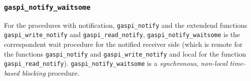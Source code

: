\documentclass[a4paper]{article}
\newlength{\st}\setlength{\st}{0pt}
\newcommand{\zsep}[1]{#1}
\newcommand{\gaspiprefix}{gaspi}
\newcommand{\function}[1]{{\tt #1}}
\newcommand{\gaspifunction}[1]{\function{\protect\zsep{\gaspiprefix\_#1}}}
\newcommand{\finalsymb}[1]{\leavevmode\unskip\penalty9999\hbox{}\nobreak\hfill\hskip 1em minus 0.5em\hbox{#1}}
\newcommand{\GASPITEST}{{\tt\protect\zsep{GASPI\_TEST}}}
\newcommand{\gaspisemantic}[1]{{\emph{#1}}}
\newenvironment{implementoradvice}{\begin{flushright}\begin{minipage}[t]{0.9\linewidth}\emph{Implementor advice:}}{\finalsymb{$\lrcorner$}\end{minipage}\end{flushright}}
\newenvironment{useradvice}{\begin{flushright}\begin{minipage}[t]{0.9\linewidth}\emph{User advice:}}{\finalsymb{$\lrcorner$}\end{minipage}\end{flushright}}
\newcommand{\insertlisting}[2]{\lstset{
basicstyle=\ttfamily
, caption={#2}
, frame=single
, numbers=left
, numberstyle=\tiny
, stepnumber=1
, showstringspaces=true
, keepspaces=true
, columns=fullflexible
, classoffset=0
, morekeywords={gaspi_rank_t,gaspi_barrier,gaspi_timeout_t,gaspi_return_t,gaspi_config_t,gaspi_proc_init,gaspi_proc_term,gaspi_proc_kill
  ,gaspi_group_commit,gaspi_group_create,gaspi_group_add,gaspi_group_size,gaspi_group_ranks
  ,gaspi_segment_id_t,gaspi_segment_alloc,gaspi_segment_register,gaspi_segment_create
  ,gaspi_segment_ptr,gaspi_queue_id_t,gaspi_offset_t,gaspi_socket_id_t,gaspi_size_t,gaspi_pointer_t
  ,gaspi_write,gaspi_read,gaspi_wait
  ,gaspi_notify,gaspi_notify_reset,gaspi_notify_wait ,gaspi_atomic_value_t
  ,gaspi_proc_num,gaspi_proc_rank
  ,gaspi_number_t,gaspi_notification_t,gaspi_notification_id_t, gaspi_time_t
  ,gaspi_atomic_compare_swap,gaspi_atomic_set
  ,GASPI_SUCCESS,GASPI_TIMEOUT,GASPI_ERROR,GASPI_GROUP_ALL
  ,GASPI_BLOCK,GASPI_TEST,GASPI_CONFIGURATION_DEFAULT,GASPI_NORANK,GASPI_NOSTRING
  ,gaspi_notify_waitsome,gaspi_notify_size,gaspi_error_message
  ,gaspi_queue_size_max,gaspi_queue_size,gaspi_time_get
  ,gaspi_network_t, gaspi_number_t
  }
, commentstyle=\color{dkgreen}
, keywordstyle=\color{colorkeyword}
, classoffset=1
, morekeywords={ASSERT}
, keywordstyle=\color{colorassert}
, classoffset=0
}}
\begin{document}
%
%
%
%

\subsubsection{\gaspifunction{notify\_waitsome}}

For the procedures with notification, \gaspifunction{notify} and the
extendend functions \gaspifunction{write\_notify} and
\gaspifunction{read\_notify}, 
\gaspifunction{notify\_waitsome} is the correspondent wait procedure
for the notified receiver side (which is remote for the functions
\gaspifunction{notify} and \gaspifunction{write\_notify} and local for
the function \gaspifunction{read\_notify}).
\gaspifunction{notify\_waitsome} is a \gaspisemantic{synchronous},
\gaspisemantic{non-local} \gaspisemantic{time-based blocking}
procedure.
\end{document}

